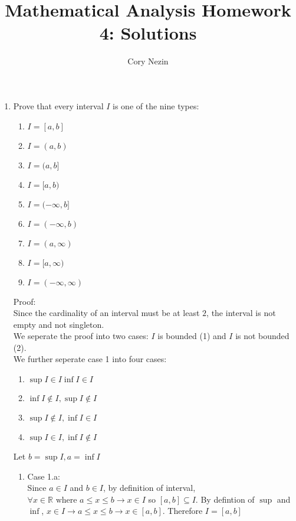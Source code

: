 \documentclass[12pt]{article}
\title{Mathematical Analysis Homework 4: Solutions}
\author{Cory Nezin}
\begin{document}
\maketitle
\begin{enumerate}
\item Prove that every interval $I$ is one of the nine types:
\begin{enumerate}
\item $I = [a,b]$
\item $I = (a,b)$
\item $I = (a,b]$
\item $I = [a,b)$
\item $I = (-\infty, b]$
\item $I = (-\infty, b)$
\item $I = (a,\infty)$
\item $I = [a,\infty)$
\item $I = (-\infty,\infty)$
\end{enumerate}
Proof:\\
Since the cardinality of an interval must be at least $2$, the interval is not empty and not singleton.\\
We seperate the proof into two cases: $I$ is bounded (1) and $I$ is not bounded (2).\\
We further seperate case 1 into four cases: 
\begin{enumerate}
\item $\sup I \in I \inf I \in I$
\item $\inf I \notin I, \sup I \notin I$
\item $\sup I \notin I, \inf I \in I$
\item $\sup I \in I, \inf I \notin I$
\end{enumerate}
Let $b = \sup I, a = \inf I$\\
\begin{enumerate}
\item Case 1.a:\\
Since $a\in I$ and $b\in I$, by definition of interval, $\forall x\in \mathbb{R} \text{ where } a\leq x\leq b \rightarrow x\in I$ so $[a,b] \subseteq I$.  By defintion of $\sup$ and $\inf$, $x\in I \rightarrow a\leq x\leq b \rightarrow x\in [a,b]$.  Therefore $I = [a,b]$


\end{enumerate}
\end{enumerate}
\end{document}
